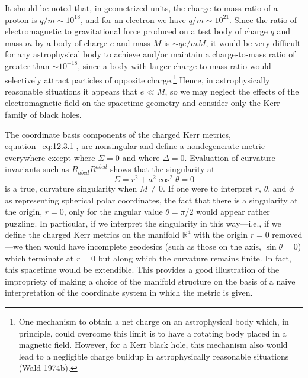 It should be noted that, in geometrized units, the charge-to-mass ratio of a proton is
\(q/m\sim10^{18}\), and for an electron we have \(q/m\sim10^{21}\). Since the ratio
of electromagnetic to gravitational force produced on a test body of charge \(q\) and
mass \(m\) by a body of charge \(e\) and mass \(M\) is \(\sim qe/mM\), it would be
very difficult for any astrophysical body to achieve and/or maintain a charge-to-mass
ratio of greater than \(\sim10^{-18}\), since a body with larger charge-to-mass ratio
would selectively attract particles of opposite charge.\footnote{One mechanism to
obtain a net charge on an astrophysical body which, in principle, could overcome this
limit is to have a rotating body placed in a magnetic field. However, for a Kerr black
hole, this mechanism also would lead to a negligible charge buildup in astrophysically
reasonable situations (Wald 1974b).} Hence, in astrophysically reasonable situations
it appears that \(e\ll M\), so we may neglect the effects of the electromagnetic field
on the spacetime geometry and consider only the Kerr family of black holes.

The coordinate basis components of the charged Kerr metrics,
equation~\eqref{eq:12.3.1}, are nonsingular and define a nondegenerate metric
everywhere except where \(\Sigma=0\) and where \(\Delta=0\). Evaluation of
curvature invariants such as \(R_{abcd}R^{abcd}\) shows that the singularity at
\begin{equation}
 \Sigma=r^2+a^2\cos^2\theta=0
 \tag{12.3.10}\label{eq:12.3.10}
\end{equation}
is a true, curvature singularity when \(M\ne0\). If one were to interpret \(r\),
\(\theta\), and \(\phi\) as representing spherical polar coordinates, the fact that
there is a singularity at the origin, \(r=0\), only for the angular value
\(\theta=\pi/2\) would appear rather puzzling. In particular, if we interpret the
singularity in this way---i.e., if we define the charged Kerr metrics on the manifold
\(\mathbb R^4\) with the origin \(r=0\) removed---we then would have incomplete
geodesics (such as those on the axis, \(\sin\theta=0\)) which terminate at \(r=0\)
but along which the curvature remains finite. In fact, this spacetime would be
extendible. This provides a good illustration of the impropriety of making a choice of
the manifold structure on the basis of a naive interpretation of the coordinate system
in which the metric is given.

